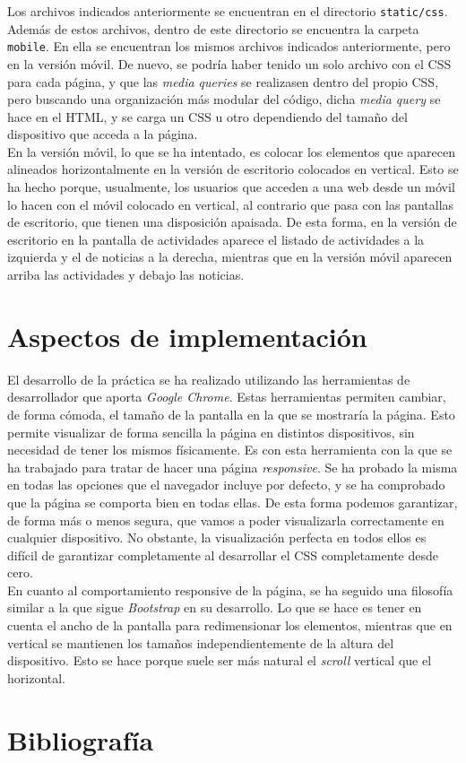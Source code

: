 \documentclass[11pt]{article}
\theoremstyle{plain}
\theoremstyle{definition}
\begin{document}
Los archivos indicados anteriormente se encuentran en el directorio
\texttt{static/css}. Además de estos archivos, dentro de este
directorio se encuentra la carpeta \texttt{mobile}. En ella se
encuentran los mismos archivos indicados anteriormente, pero en la
versión móvil. De nuevo, se podría haber tenido un solo archivo con el
CSS para cada página, y que las \textit{media queries} se realizasen
dentro del propio CSS, pero buscando una organización más modular del
código, dicha \textit{media query} se hace en el HTML, y se carga un
CSS u otro dependiendo del tamaño del dispositivo que acceda a la
página.\\

En la versión móvil, lo que se ha intentado, es colocar los elementos
que aparecen alineados horizontalmente en la versión de escritorio
colocados en vertical. Esto se ha hecho porque, usualmente, los usuarios
que acceden a una web desde un móvil lo hacen con el móvil colocado
en vertical, al contrario que pasa con las pantallas de escritorio,
que tienen una disposición apaisada. De esta forma, en la versión
de escritorio en la pantalla de actividades aparece el listado de
actividades a la izquierda y el de noticias a la derecha, mientras
que en la versión móvil aparecen arriba las actividades y debajo las
noticias.

\section{Aspectos de implementación}

El desarrollo de la práctica se ha realizado utilizando las
herramientas de desarrollador que aporta \textit{Google Chrome}. Estas
herramientas permiten cambiar, de forma cómoda, el tamaño de la
pantalla en la que se mostraría la página. Esto permite visualizar de
forma sencilla la página en distintos dispositivos, sin necesidad de
tener los mismos físicamente. Es con esta herramienta con la que se ha
trabajado para tratar de hacer una página \textit{responsive}.  Se ha
probado la misma en todas las opciones que el navegador incluye por
defecto, y se ha comprobado que la página se comporta bien en todas
ellas. De esta forma podemos garantizar, de forma más o menos segura,
que vamos a poder visualizarla correctamente en cualquier dispositivo.
No obstante, la visualización perfecta en todos ellos es difícil de
garantizar completamente al desarrollar el CSS completamente desde
cero.\\

En cuanto al comportamiento responsive de la página, se ha seguido una
filosofía similar a la que sigue \textit{Bootstrap} en su desarrollo.
Lo que se hace es tener en cuenta el ancho de la pantalla para
redimensionar los elementos, mientras que en vertical se mantienen
los tamaños independientemente de la altura del dispositivo. Esto se
hace porque suele ser más natural el \textit{scroll} vertical que
el horizontal.


\section{Bibliografía}

\printbibliography
\end{document}
